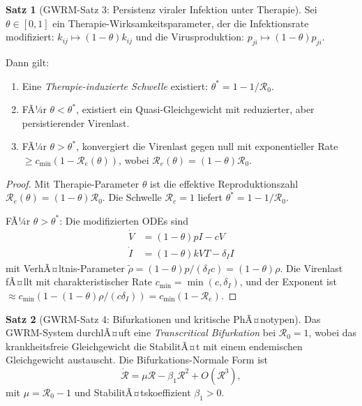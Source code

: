 ﻿\documentclass[a4paper,12pt]{article}
\theoremstyle{definition}
\newtheorem{satz}{Satz}
\begin{document}
\begin{satz}[GWRM-Satz 3: Persistenz viraler Infektion unter Therapie]
Sei $\theta \in [0,1]$ ein Therapie-Wirksamkeitsparameter, der die Infektionsrate modifiziert: $k_{ij} \mapsto (1-\theta) k_{ij}$ und die Virusproduktion: $p_{ji} \mapsto (1-\theta) p_{ji}$.

Dann gilt:
\begin{enumerate}
\item Eine \textit{Therapie-induzierte Schwelle} existiert: $\theta^* = 1 - 1/\mathcal{R}_0$. 
\item FÃ¼r $\theta < \theta^*$, existiert ein Quasi-Gleichgewicht mit reduzierter, aber persistierender Virenlast.
\item FÃ¼r $\theta > \theta^*$, konvergiert die Virenlast gegen null mit exponentieller Rate $\geq c_{\min}(1 - \mathcal{R}_e(\theta))$, wobei $\mathcal{R}_e(\theta) = (1-\theta) \mathcal{R}_0$.
\end{enumerate}
\end{satz}

\begin{proof}
Mit Therapie-Parameter $\theta$ ist die effektive Reproduktionszahl $\mathcal{R}_e(\theta) = (1-\theta) \mathcal{R}_0$. Die Schwelle $\mathcal{R}_e = 1$ liefert $\theta^* = 1 - 1/\mathcal{R}_0$.

FÃ¼r $\theta > \theta^*$: Die modifizierten ODEs sind
\begin{align}
\dot{V} &= (1-\theta) p I - c V \\
\dot{I} &= (1-\theta) k V T - \delta_I I
\end{align}
mit VerhÃ¤ltnis-Parameter $\tilde{\rho} = (1-\theta) p / (\delta_I c) = (1-\theta) \rho$. Die Virenlast fÃ¤llt mit charakteristischer Rate $c_{\min} = \min(c, \delta_I)$, und der Exponent ist $\approx c_{\min} (1 - (1-\theta)\rho/(c \delta_I)) = c_{\min}(1 - \mathcal{R}_e)$.
\end{proof}

\begin{satz}[GWRM-Satz 4: Bifurkationen und kritische PhÃ¤notypen]
Das GWRM-System durchlÃ¤uft eine \emph{Transcritical Bifurkation} bei $\mathcal{R}_0 = 1$, wobei das krankheitsfreie Gleichgewicht die StabilitÃ¤t mit einem endemischen Gleichgewicht austauscht. Die Bifurkations-Normale Form ist
\[
\dot{\mathcal{R}} = \mu \mathcal{R} - \beta_1 \mathcal{R}^2 + O(\mathcal{R}^3),
\]
mit $\mu = \mathcal{R}_0 - 1$ und StabilitÃ¤tskoeffizient $\beta_1 > 0$.
\end{satz}
\end{document}
